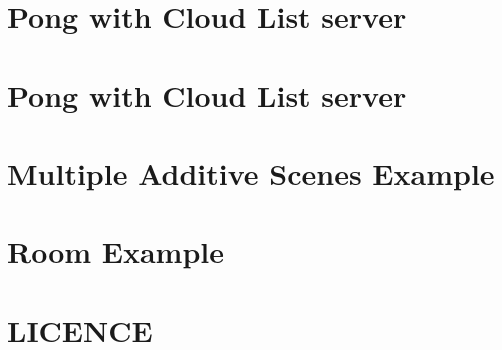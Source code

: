 \let\mypdfximage\pdfximage\def\pdfximage{\immediate\mypdfximage}\documentclass[twoside]{book}
\newcommand{\+}{\discretionary{\mbox{\scriptsize$\hookleftarrow$}}{}{}}
\begin{document}
\chapter{Pong with Cloud List server}
\label{md__c___users_aaron__documents__git_hub__my_f_p_s__assets__mirror__examples__cloud__pong_with_list_server__r_e_a_d_m_e}

\chapter{Pong with Cloud List server}
\label{md__c___users_aaron__documents__git_hub__my_f_p_s__assets__mirror__examples__cloud__tanks_with_list_server__r_e_a_d_m_e}

\chapter{Multiple Additive Scenes Example}
\label{md__c___users_aaron__documents__git_hub__my_f_p_s__assets__mirror__examples__multiple_additive_scenes__r_e_a_d_m_e}

\chapter{Room Example}
\label{md__c___users_aaron__documents__git_hub__my_f_p_s__assets__mirror__examples__room__r_e_a_d_m_e}

\chapter{L\+I\+C\+E\+N\+CE}
\label{md__c___users_aaron__documents__git_hub__my_f_p_s__assets__mirror__runtime__transport__websocket1310a04b8b692c11cc147032fc7a2284}

\end{document}
